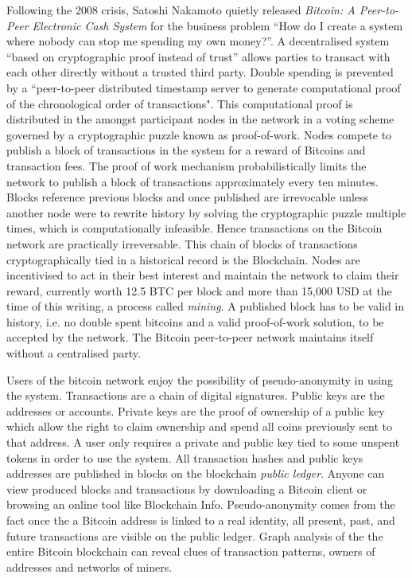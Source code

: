 \documentclass[12pt]{article} %
\begin{document}
Following the 2008 crisis, Satoshi Nakamoto quietly released \textit{Bitcoin: A Peer-to-Peer Electronic Cash System}\cite{nakamoto2008bitcoin} for the business problem ``How do I create a system where nobody can stop me spending my own money?''\cite{brown2016introducing}. A decentralised system ``based on cryptographic proof instead of trust'' allows parties to transact with each other directly without a trusted third party. Double spending is prevented by a ``peer-to-peer distributed timestamp server to generate computational proof of the chronological order of transactions"\cite{nakamoto2008bitcoin}. This computational proof is distributed in the amongst participant nodes in the network in a voting scheme governed by a cryptographic puzzle known as proof-of-work. Nodes compete to publish a block of transactions in the system for a reward of Bitcoins and transaction fees. The proof of work mechanism probabilistically limits the network to publish a block of transactions approximately every ten minutes. Blocks reference previous blocks and once published are irrevocable unless another node were to rewrite history by solving the cryptographic puzzle multiple times, which is computationally infeasible. Hence transactions on the Bitcoin network are practically irreversable. This chain of blocks of transactions cryptographically tied in a historical record is the Blockchain. Nodes are incentivised to act in their best interest and maintain the network to claim their reward, currently worth 12.5 BTC per block and more than 15,000 USD at the time of this writing, a process called \textit{mining}. A published block has to be valid in history, i.e. no double spent bitcoins and a valid proof-of-work solution, to be accepted by the network. The Bitcoin peer-to-peer network maintains itself without a centralised party\cite{nakamoto2008bitcoin}.

Users of the bitcoin network enjoy the possibility of pseudo-anonymity in using the system. Transactions are a chain of digital signatures. Public keys are the addresses or accounts. Private keys are the proof of ownership of a public key which allow the right to claim ownership and spend all coins previously sent to that address. A user only requires a private and public key tied to some unspent tokens in order to use the system. All transaction hashes and public keys addresses are published in blocks on the blockchain \textit{public ledger}. Anyone can view produced blocks and transactions by downloading a Bitcoin client or browsing an online tool like Blockchain Info\cite{blockchaininfo}.  Pseudo-anonymity comes from the fact once the a Bitcoin address is linked to a real identity, all present, past, and future transactions are visible on the public ledger. Graph analysis of the the entire Bitcoin blockchain can reveal clues of transaction patterns, owners of addresses and networks of miners.
\end{document}
